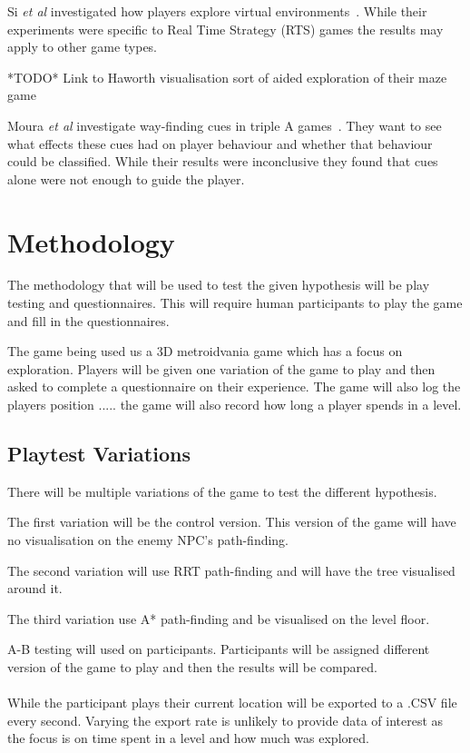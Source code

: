 \documentclass[journal]{IEEEtran}
\begin{document}
Si \textit{et al} investigated how players explore virtual environments~\cite{si2017}. While their experiments were specific to Real Time Strategy (RTS) games the results may apply to other game types.

*TODO* Link to Haworth visualisation sort of aided exploration of their maze game


Moura \textit{et al} investigate way-finding cues in triple A games~\cite{moura2014}. They want to see what effects these cues had on player behaviour and whether that behaviour could be classified. While their results were inconclusive they found that cues alone were not enough to guide the player.  

\section{Methodology} %
The methodology that will be used to test the given hypothesis will be play testing and questionnaires. This will require human participants to play the game and fill in the questionnaires. 

The game being used us a 3D metroidvania game which has a focus on exploration. Players will be given one variation of the game to play and then asked to complete a questionnaire on their experience. The game will also log the players position .....
the game will also record how long a player spends in a level.  

\subsection{Playtest Variations}
There will be multiple variations of the game to test the different hypothesis. 

The first variation will be the control version. This version of the game will have no visualisation on the enemy NPC's path-finding.

The second variation will use RRT path-finding and will have the tree visualised around it. 

The third variation use A* path-finding and be visualised on the level floor. 

A-B testing will used on participants. Participants will be assigned different version of the game to play and then the results will be compared. \\
\\
While the participant plays their current location will be exported to a .CSV file every second. Varying the export rate is unlikely to provide data of interest as the focus is on time spent in a level and how much was explored. 
\end{document}
